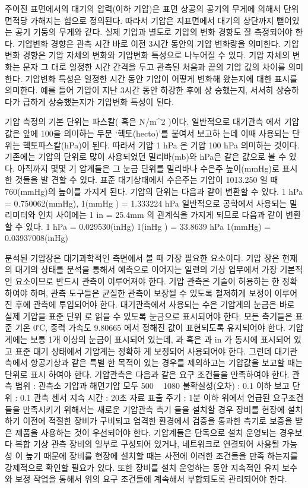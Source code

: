주어진 표면에서의 대기의 압력(이하 기압)은 표면 상공의 공기의 무게에
의해서 단위 면적당 가해지는 힘으로 정의된다. 따라서 기압은 지표면에서
대기의 상단까지 뻗어있는 공기 기둥의 무게와 같다. 실제 기압과 별도로
기압의 변화 경향도 잘 측정되어야 한다. 기압변화 경향은 관측 시간 바로
이전 3시간 동안의 기압 변화량을 의미한다. 기압변화 경향은 기압 자체의
변화와 기압변화 특성으로 나누어질 수 있다. 기압 자체의 변화는 문자 그
대로 일정한 시간 간격을 두고 관측된 처음과 끝의 기압 값의 차이를 의미
한다. 기압변화 특성은 일정한 시간 동안 기압이 어떻게 변화해 왔는지에
대한 표시를 의미한다. 예를 들어 기압이 지난 3시간 동안 하강한 후에 상
승했는지, 서서히 상승하다가 급하게 상승했는지가 기압변화 특성이 된다.


기압 측정의 기본 단위는 파스칼( 혹은 N/m^2 )이다. 일반적으로 대기관측
에서 기압값은 앞에 100을 의미하는 두문 ‘헥토(hecto)’를 붙여서 보고하
는데 이때 사용되는 단위는 헥토파스칼(hPa)이 된다. 따라서 기압 1 hPa 은 기압 100 hPa \을 의미하는 것이다. 기존에는 기압의 단위로 많이 사용되었던 밀리바(mb)와 hPa은 같은 값으로 볼 수 있다. 아직까지 몇몇 기 압계들은 그 눈금 단위를 밀리바나 수은주 높이(mmHg)로 표시한 것들을 발
견할 수 있다. 표준 대기상태에서 수은주는 기압이 1013.250 일 때
760(mmHg)의 높이를 가지게 된다.
기압의 단위는 다음과 같이 변환할 수 있다.
1 hPa = 0.750062(mmHg), 
1(mmHg ) = 1.333224 hPa
일반적으로 공학에서 사용되는 밀리미터와 인치 사이에는 1 in = 25.4mm
의 관계식을 가지게 되므로 다음과 같이 변환할 수 있다.
1 hPa = 0.029530(inHg)
1(inHg ) = 33.8639 hPa
1(mmHg) = 0.03937008(inHg)

분석된 기압장은 대기과학적인 측면에서 볼 때 가장 필요한 요소이다. 기압
장은 현재의 대기의 상태를 분석을 통해서 예측으로 이어지는 일련의 기상
업무에서 가장 기본적인 요소이므로 반드시 관측이 이루어져야 한다. 기압
관측은 기술이 허용하는 한 정확하여야 하며, 관측 도구들은 균질한 관측이
보장될 수 있도록 철저하게 보정이 이루어진 후에 관측에 투입되어야 한다.
대기관측에서 사용되는 수은 기압계의 눈금은 바로 실제 기압을 표준 단위
로 읽을 수 있도록 눈금으로 표시되어야 한다. 모든 측기들은 표준 기온
0℃, 중력 가속도 9.80665 에서 정해진 값이 표현되도록 유지되어야
한다.
기압계에는 보통 1개 이상의 눈금이 표시되어 있는데, 과 혹은
과 in 가 동시에 표시되어 있고 표준 대기 상태에서 기압계는 정확하
게 보정되어 사용되어야 한다. 그런데 대기관측에서 항공기상과 같은 특별
한 목적이 있는 경우를 제외하고는 기압값을 보고할 때는 단위로 표시
하여야 한다.
기압관측은 다음과 같은 요구 조건들을 만족하여야 한다.
관측 범위 : 관측소 기압과 해면기압 모두 500 ~ 1080
불확실성(오차) : 0.1 이하
보고 단위 : 0.1
관측 센서 지속 시간 : 20초
자료 표출 주기 : 1분 이하
위에서 언급된 요구조건들을 만족시키기 위해서는 새로운 기압관측 측기
들을 설치할 경우 장비를 현장에 설치하기 이전에 적절한 장비가 구비되고
엄격한 환경에서 검증을 통과한 측기로 보증을 받은 제품을 사용하는 것이
우선되어야 한다. 기압계들은 단독으로 설치 운영되는 경우보다 복합 기상
관측 장비의 일부로 구성되어 있거나, 네트워크로 연결되어 사용될 가능성
이 높기 때문에 장비를 현장에 설치할 때는 사전에 이러한 조건들을 만족
하는지를 강제적으로 확인할 필요가 있다. 또한 장비를 설치 운영하는 동안
지속적인 유지 보수와 보정 작업을 통해서 위의 요구 조건들에 계속해서
부합되도록 관리되어야 한다.

